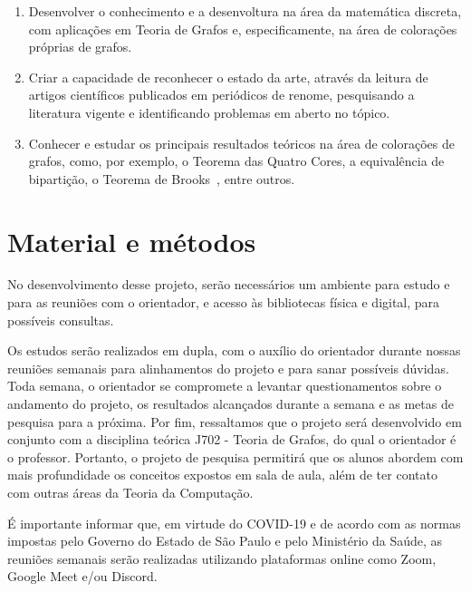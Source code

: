 \documentclass[12pt]{article}
\begin{document}
	\begin{enumerate}
		\item Desenvolver  o conhecimento e a desenvoltura na área da matemática discreta, com aplicações em Teoria de Grafos e, especificamente, na área de colorações próprias de grafos.
		\item Criar a capacidade de reconhecer o estado da arte, através da leitura de artigos científicos publicados em periódicos de renome, pesquisando a literatura vigente e identificando problemas em aberto no tópico.
		\item Conhecer e estudar os principais resultados teóricos na área de colorações de grafos, como, por exemplo, o Teorema das Quatro Cores, a equivalência de bipartição, o Teorema de Brooks~\cite{Brooks41}, entre outros.
	\end{enumerate}
	
	
        \section{Material e métodos}

       No desenvolvimento desse projeto, serão necessários um ambiente para estudo e para as reuniões com o orientador, e acesso às bibliotecas física e digital, para possíveis consultas.

       Os estudos serão realizados em dupla, com o auxílio do orientador durante nossas reuniões semanais para   alinhamentos do projeto e para sanar possíveis dúvidas. Toda semana, o orientador se compromete a levantar questionamentos sobre o andamento do projeto, os resultados alcançados durante a semana e as metas de pesquisa para a próxima. Por fim, ressaltamos que o projeto será desenvolvido em conjunto com a disciplina teórica J702 - Teoria de Grafos, do qual o orientador é o professor. Portanto, o projeto de pesquisa permitirá que os alunos abordem com mais profundidade os conceitos expostos em sala de aula, além de ter contato com outras áreas da Teoria da Computação.
 
      É importante informar que, em virtude do COVID-19 e de acordo com as normas impostas pelo Governo  do Estado de São Paulo e pelo Ministério da Saúde, as reuniões semanais serão realizadas utilizando plataformas online como Zoom, Google Meet e/ou Discord. 

	
	
	
	
	
\end{document}
